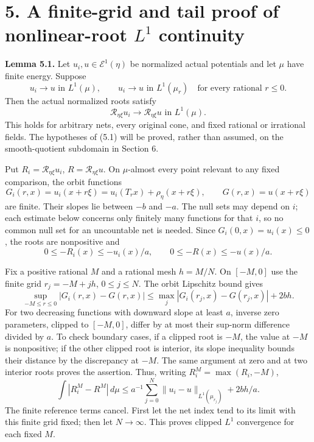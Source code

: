 \documentclass[
  10pt,
]{article}
\begin{document}
\section{\texorpdfstring{5. A finite-grid and tail proof of
nonlinear-root \(L^1\)
continuity}{5. A finite-grid and tail proof of nonlinear-root L\^{}1 continuity}}\label{a-finite-grid-and-tail-proof-of-nonlinear-root-l1-continuity}

\textbf{Lemma 5.1.} Let \(u_i,u\in\mathcal E^1(\eta)\) be normalized
actual potentials and let \(\mu\) have finite energy. Suppose \[
u_i\longrightarrow u\text{ in }L^1(\mu),\qquad
u_i\longrightarrow u\text{ in }L^1(\mu_r)\quad\text{for every rational }r\le0.  \tag{5.1}
\] Then the actual normalized roots satisfy \[
\mathcal R_{\eta\xi}u_i\longrightarrow\mathcal R_{\eta\xi}u
                       \text{ in }L^1(\mu).                           \tag{5.2}
\] This holds for arbitrary nets, every original cone, and fixed
rational or irrational fields. The hypotheses of (5.1) will be proved,
rather than assumed, on the smooth-quotient subdomain in Section 6.

Put \(R_i=\mathcal R_{\eta\xi}u_i\), \(R=\mathcal R_{\eta\xi}u\). On
\(\mu\)-almost every point relevant to any fixed comparison, the orbit
functions \[
G_i(r,x)=u_i(x+r\xi)=u_i(T_r x)+\rho_\eta(x+r\xi),\qquad G(r,x)=u(x+r\xi)
\] are finite. Their slopes lie between \(-b\) and \(-a\). The null sets
may depend on \(i\); each estimate below concerns only finitely many
functions for that \(i\), so no common null set for an uncountable net
is needed. Since \(G_i(0,x)=u_i(x)\le0\), the roots are nonpositive and
\[
0\le -R_i(x)\le -u_i(x)/a,
\qquad 0\le -R(x)\le -u(x)/a.                              \tag{5.3}
\]

Fix a positive rational \(M\) and a rational mesh \(h=M/N\). On
\([-M,0]\) use the finite grid \(r_j=-M+jh\), \(0\le j\le N\). The orbit
Lipschitz bound gives \[
\sup_{-M\le r\le0}|G_i(r,x)-G(r,x)|
 \le\max_j|G_i(r_j,x)-G(r_j,x)|+2bh.
\] For two decreasing functions with downward slope at least \(a\),
inverse zero parameters, clipped to \([-M,0]\), differ by at most their
sup-norm difference divided by \(a\). To check boundary cases, if a
clipped root is \(-M\), the value at \(-M\) is nonpositive; if the other
clipped root is interior, its slope inequality bounds their distance by
the discrepancy at \(-M\). The same argument at zero and at two interior
roots proves the assertion. Thus, writing \(R_i^M=\max(R_i,-M)\), \[
\int|R_i^M-R^M|\,d\mu
 \le a^{-1}\sum_{j=0}^N\|u_i-u\|_{L^1(\mu_{r_j})}+2bh/a.                \tag{5.4}
\] The finite reference terms cancel. First let the net index tend to
its limit with this finite grid fixed; then let \(N\to\infty\). This
proves clipped \(L^1\) convergence for each fixed \(M\).
\end{document}
